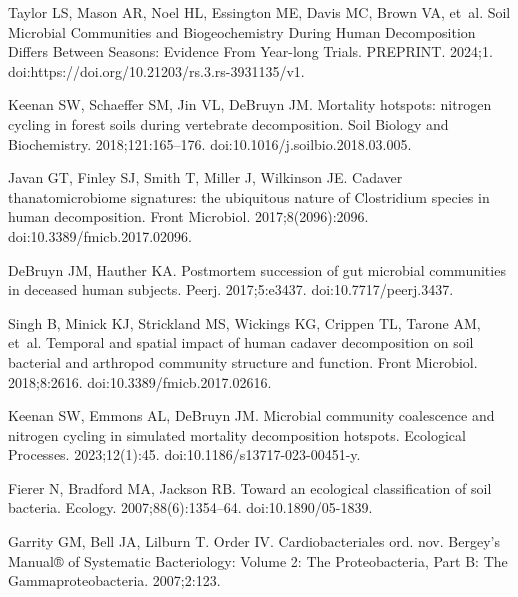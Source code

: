 \documentclass[
  10pt,
  letterpaper,
]{article}
\begin{document}
\begin{thebibliography}{10}
    Taylor LS, Mason AR, Noel HL, Essington ME, Davis MC, Brown VA, et~al.
    \newblock Soil Microbial Communities and Biogeochemistry During Human Decomposition Differs Between Seasons: Evidence From Year-long Trials.
    \newblock PREPRINT. 2024;1.
    \newblock doi:{https://doi.org/10.21203/rs.3.rs-3931135/v1}.
    
    Keenan SW, Schaeffer SM, Jin VL, DeBruyn JM.
    \newblock Mortality hotspots: nitrogen cycling in forest soils during vertebrate decomposition.
    \newblock Soil Biology and Biochemistry. 2018;121:165--176.
    \newblock doi:{10.1016/j.soilbio.2018.03.005}.
    
    Javan GT, Finley SJ, Smith T, Miller J, Wilkinson JE.
    \newblock Cadaver thanatomicrobiome signatures: the ubiquitous nature of {Clostridium} species in human decomposition.
    \newblock Front Microbiol. 2017;8(2096):2096.
    \newblock doi:{10.3389/fmicb.2017.02096}.
    
    DeBruyn JM, Hauther KA.
    \newblock Postmortem succession of gut microbial communities in deceased human subjects.
    \newblock Peerj. 2017;5:e3437.
    \newblock doi:{10.7717/peerj.3437}.
    
    Singh B, Minick KJ, Strickland MS, Wickings KG, Crippen TL, Tarone AM, et~al.
    \newblock Temporal and spatial impact of human cadaver decomposition on soil bacterial and arthropod community structure and function.
    \newblock Front Microbiol. 2018;8:2616.
    \newblock doi:{10.3389/fmicb.2017.02616}.
    
    Keenan SW, Emmons AL, DeBruyn JM.
    \newblock Microbial community coalescence and nitrogen cycling in simulated mortality decomposition hotspots.
    \newblock Ecological Processes. 2023;12(1):45.
    \newblock doi:{10.1186/s13717-023-00451-y}.
    
    Fierer N, Bradford MA, Jackson RB.
    \newblock Toward an ecological classification of soil bacteria.
    \newblock Ecology. 2007;88(6):1354--64.
    \newblock doi:{10.1890/05-1839}.
    
    Garrity GM, Bell JA, Lilburn T.
    \newblock Order {IV}. {Cardiobacteriales} ord. nov.
    \newblock Bergey's Manual® of Systematic Bacteriology: Volume 2: The Proteobacteria, Part B: The Gammaproteobacteria. 2007;2:123.
    

\end{thebibliography}
\end{document}
